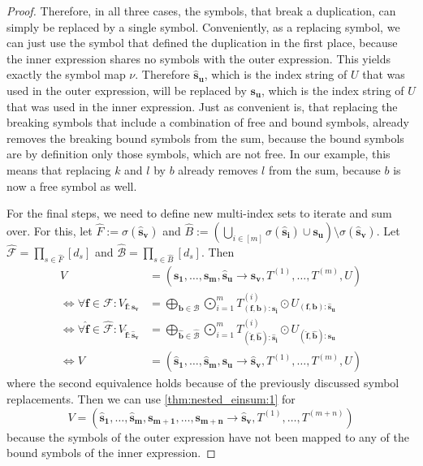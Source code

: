 \begin{proof}
    Therefore, in all three cases, the symbols, that break a duplication, can simply be replaced by a single symbol.
    Conveniently, as a replacing symbol, we can just use the symbol that defined the duplication in the first place,
    because the inner expression shares no symbols with the outer expression.
    This yields exactly the symbol map $\nu$.
    Therefore $\bm{\hat{s}_u}$, which is the index string of $U$ that was used in the outer expression, will be replaced by $\bm{s_u}$, which is the index string of $U$ that was used in the inner expression.
    Just as convenient is, that replacing the breaking symbols that include a combination of free and bound symbols, already removes the breaking bound symbols from the sum,
    because the bound symbols are by definition only those symbols, which are not free.
    In our example, this means that replacing $k$ and $l$ by $b$ already removes $l$ from the sum, because $b$ is now a free symbol as well.

    For the final steps, we need to define new multi-index sets to iterate and sum over.
    For this, let $\hat{F} := \sigma(\bm{\hat{s}_v})$ and $\hat{B} := \left(\bigcup_{i \in [m]} \sigma(\bm{\hat{s}_i}) \cup \bm{s_u}\right) \setminus \sigma(\bm{\hat{s}_v})$.
    Let $\mathcal{\hat{F}} = \prod_{s \in \hat{F}} [d_s]$ and $\mathcal{\hat{B}} = \prod_{s \in \hat{B}} [d_s]$.
    Then
    \begin{align*}
        V                                                                                 & = (\bm{s_1},\dots,\bm{s_m}, \bm{\hat{s}_u} \rightarrow \bm{s_v}, T^{(1)},\dots,T^{(m)}, U)                                                                                                \\
        \iff \forall \bm{f} \in \mathcal{F}: V_{\bm{f}: \bm{s_v}}                         & = \bigoplus\limits_{\bm{b} \in \mathcal{B}} \bigodot\limits_{i = 1}^{m} T^{(i)}_{(\bm{f}, \bm{b}):\bm{s_i}} \odot U_{(\bm{f}, \bm{b}):\bm{\hat{s}_u}}                                     \\
        \iff \forall \bm{\hat{f}} \in \mathcal{\hat{F}}: V_{\bm{\hat{f}}: \bm{\hat{s}_v}} & = \bigoplus\limits_{\bm{\hat{b}} \in \mathcal{\hat{B}}} \bigodot\limits_{i = 1}^{m} T^{(i)}_{(\bm{\hat{f}}, \bm{\hat{b}}):\bm{\hat{s}_i}} \odot U_{(\bm{\hat{f}}, \bm{\hat{b}}):\bm{s_u}} \\
        \iff V                                                                            & = (\bm{\hat{s}_1},\dots,\bm{\hat{s}_m}, \bm{s_u} \rightarrow \bm{\hat{s}_v}, T^{(1)},\dots,T^{(m)}, U)
    \end{align*}
    where the second equivalence holds because of the previously discussed symbol replacements.
    Then we can use \autoref{thm:nested_einsum:1} for
    $$V = (\bm{\hat{s}_1}, \dots, \bm{\hat{s}_m}, \bm{s_{m + 1}}, \dots, \bm{s_{m + n}} \rightarrow \bm{\hat{s}_v}, T^{(1)}, \dots, T^{(m + n)})$$
    because the symbols of the outer expression have not been mapped to any of the bound symbols of the inner expression.
\end{proof}
\bigskip